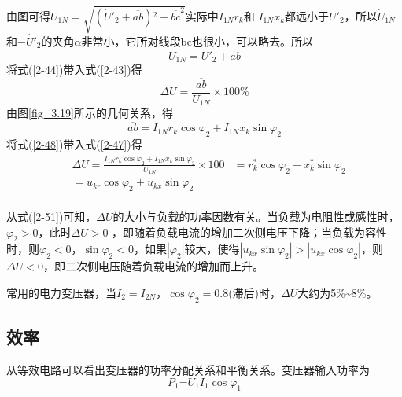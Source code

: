 \documentclass{book}
\begin{document}
由图可得${{U}_{1N}}=\sqrt{\left( {{{{\dot{U}}'}}_{2}}+\overline{ab} \right){{}^{2}}+{{\overline{bc}}^{2}}}$实际中${{I}_{1N}}{{r}_{k}}$和 ${{I}_{1N}}{{x}_{k}}$都远小于${{{U}'}_{2}}$，所以${{\dot{U}}_{1N}}$和$-{{\dot{{U}'}}_{2}}$的夹角$\alpha $非常小，它所对线段bc也很小，可以略去。所以
\begin{equation}
{{U}_{1N}}={{{U}'}_{2}}+\overline{ab}
\label{2-48}
\end{equation}
将式(\ref{2-44})带入式(\ref{2-43})得
\begin{equation}
\Delta U=\frac{\overline{ab}}{{{U}_{1N}}}\times 100\%
\label{2-49}
\end{equation}
由图\ref{fig_3.19}所示的几何关系，得
\begin{equation}
\overline{ab}={{I}_{1N}}{{r}_{k}}\cos {{\varphi }_{2}}+{{I}_{1N}}{{x}_{k}}\sin {{\varphi }_{2}}
\label{2-50}
\end{equation}
将式(\ref{2-48})带入式(\ref{2-47})得
\begin{equation}
\begin{aligned}
& \Delta U=\frac{{{I}_{1N}}{{r}_{k}}\cos {{\varphi }_{2}}+{{I}_{1N}}{{x}_{k}}\sin {{\varphi }_{2}}}{{{U}_{1N}}}\times 100%
& =r_{k}^{*}\cos {{\varphi }_{2}}+x_{k}^{*}\sin {{\varphi }_{2}} \\ 
& =u_{kr}^{{}}\cos {{\varphi }_{2}}+u_{kx}^{{}}\sin {{\varphi }_{2}} \\ 
\end{aligned}
\label{2-51}
\end{equation}

从式(\ref{2-51})可知，$\Delta U$的大小与负载的功率因数有关。当负载为电阻性或感性时， ${{\varphi }_{2}}>0$，此时$\Delta U>0$ ，即随着负载电流的增加二次侧电压下降；当负载为容性时，则${{\varphi }_{2}}<0$，$\sin {{\varphi }_{2}}<0$，如果$\left| {{\varphi }_{2}} \right|$较大，使得$\left| {{u}_{kx}}\sin {{\varphi }_{2}} \right|>\left| {{u}_{kx}}\cos {{\varphi }_{2}} \right|$，则$\Delta U<0$，即二次侧电压随着负载电流的增加而上升。

常用的电力变压器，当${{I}_{2}}={{I}_{2N}}$，$\cos {{\varphi }_{2}}=0.8$(滞后)时，$\Delta U$大约为5\%\textasciitilde8\%。

\subsection{效率}
从等效电路可以看出变压器的功率分配关系和平衡关系。变压器输入功率为
$${{P}_{1}}\text{=}{{U}_{1}}{{I}_{1}}\cos {{\varphi }_{1}}$$
\end{document}
